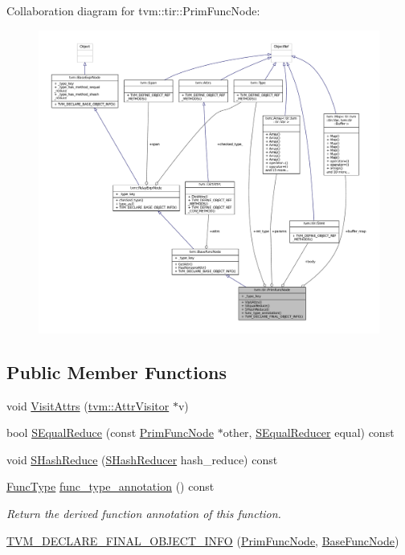 Collaboration diagram for tvm\+:\+:tir\+:\+:Prim\+Func\+Node\+:
\nopagebreak
\begin{figure}[H]
\begin{center}
\leavevmode
\includegraphics[width=350pt]{classtvm_1_1tir_1_1PrimFuncNode__coll__graph}
\end{center}
\end{figure}
\subsection*{Public Member Functions}
\begin{DoxyCompactItemize}
\item 
void \hyperlink{classtvm_1_1tir_1_1PrimFuncNode_add7c60c29895497221750e01e54f5023}{Visit\+Attrs} (\hyperlink{classtvm_1_1AttrVisitor}{tvm\+::\+Attr\+Visitor} $\ast$v)
\item 
bool \hyperlink{classtvm_1_1tir_1_1PrimFuncNode_a424c7818ec81111ec8dc2bff6b0d62e1}{S\+Equal\+Reduce} (const \hyperlink{classtvm_1_1tir_1_1PrimFuncNode}{Prim\+Func\+Node} $\ast$other, \hyperlink{classtvm_1_1SEqualReducer}{S\+Equal\+Reducer} equal) const 
\item 
void \hyperlink{classtvm_1_1tir_1_1PrimFuncNode_a82faf0ae143826287ecf4b48da4d904f}{S\+Hash\+Reduce} (\hyperlink{classtvm_1_1SHashReducer}{S\+Hash\+Reducer} hash\+\_\+reduce) const 
\item 
\hyperlink{classtvm_1_1FuncType}{Func\+Type} \hyperlink{classtvm_1_1tir_1_1PrimFuncNode_a63f4bba334dff54fee2097d17804c045}{func\+\_\+type\+\_\+annotation} () const 
\begin{DoxyCompactList}\small\item\em Return the derived function annotation of this function. \end{DoxyCompactList}\item 
\hyperlink{classtvm_1_1tir_1_1PrimFuncNode_a612a3bbaa9418eb629180e80084a9d69}{T\+V\+M\+\_\+\+D\+E\+C\+L\+A\+R\+E\+\_\+\+F\+I\+N\+A\+L\+\_\+\+O\+B\+J\+E\+C\+T\+\_\+\+I\+N\+FO} (\hyperlink{classtvm_1_1tir_1_1PrimFuncNode}{Prim\+Func\+Node}, \hyperlink{classtvm_1_1BaseFuncNode}{Base\+Func\+Node})
\end{DoxyCompactItemize}

